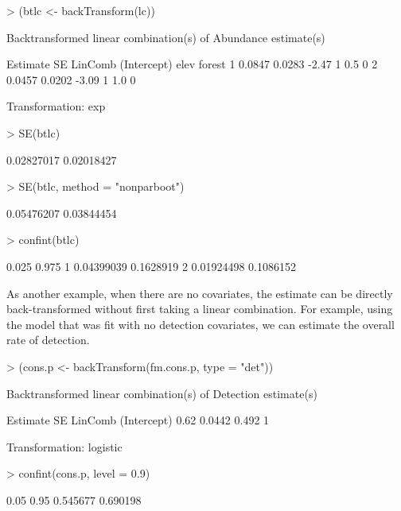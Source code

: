 \documentclass[article,shortnames]{jss}
\begin{document}
\begin{Schunk}
\begin{Sinput}
> (btlc <- backTransform(lc))
\end{Sinput}
\begin{Soutput}
Backtransformed linear combination(s) of Abundance estimate(s)

  Estimate     SE LinComb (Intercept) elev forest
1   0.0847 0.0283   -2.47           1  0.5      0
2   0.0457 0.0202   -3.09           1  1.0      0

Transformation: exp 
\end{Soutput}
\begin{Sinput}
> SE(btlc)
\end{Sinput}
\begin{Soutput}
[1] 0.02827017 0.02018427
\end{Soutput}
\begin{Sinput}
> SE(btlc, method = "nonparboot")
\end{Sinput}
\begin{Soutput}
[1] 0.05476207 0.03844454
\end{Soutput}
\begin{Sinput}
> confint(btlc)
\end{Sinput}
\begin{Soutput}
       0.025     0.975
1 0.04399039 0.1628919
2 0.01924498 0.1086152
\end{Soutput}
\end{Schunk}

As another example, when there are no covariates, the estimate can be
directly back-transformed without first taking a linear combination.
For example, using the model that was fit with no detection
covariates, we can estimate the overall rate of detection.

\begin{Schunk}
\begin{Sinput}
> (cons.p <- backTransform(fm.cons.p, type = "det"))
\end{Sinput}
\begin{Soutput}
Backtransformed linear combination(s) of Detection estimate(s)

 Estimate     SE LinComb (Intercept)
     0.62 0.0442   0.492           1

Transformation: logistic 
\end{Soutput}
\begin{Sinput}
> confint(cons.p, level = 0.9)
\end{Sinput}
\begin{Soutput}
     0.05     0.95
 0.545677 0.690198
\end{Soutput}
\end{Schunk}
\end{document}
